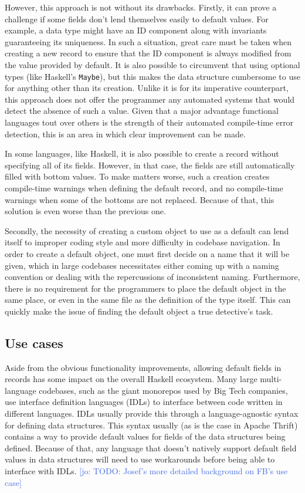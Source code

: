 \documentclass[en]{pracamgr}
\newcommand{\jcom}[1]{\textcolor{RoyalBlue}{[jo: #1]}}
\begin{document}
However, this approach is not without its drawbacks.
Firstly, it can prove a challenge if some fields don't lend themselves easily to default values. 
For example, a data type might have an ID component along with invariants guaranteeing its uniqueness. 
In such a situation, great care must be taken when creating a new record to ensure that the ID component is always modified from the value provided by default.
It is also possible to circumvent that using optional types (like Haskell's \texttt{Maybe}), but this makes the data structure cumbersome to use for anything other than its creation.
Unlike it is for its imperative counterpart, this approach does not offer the programmer any automated systems that would detect the absence of such a value.
Given that a major advantage functional languages tout over others is the strength of their automated compile-time error detection, this is an area in which clear improvement can be made.

In some languages, like Haskell, it is also possible to create a record without specifying all of its fields.
However, in that case, the fields are still automatically filled with bottom values.
To make matters worse, such a creation creates compile-time warnings when defining the default record, and no compile-time warnings when some of the bottoms are not replaced.
Because of that, this solution is even worse than the previous one.

Secondly, the necessity of creating a custom object to use as a default can lend itself to improper coding style and more difficulty in codebase navigation.
In order to create a default object, one must first decide on a name that it will be given, which in large codebases necessitates either coming up with a naming convention or dealing with the repercussions of inconsistent naming. 
Furthermore, there is no requirement for the programmers to place the default object in the same place, or even in the same file as the definition of the type itself.
This can quickly make the issue of finding the default object a true detective's task. 

\subsection{Use cases}
Aside from the obvious functionality improvements, allowing default fields in records has some impact on the overall Haskell ecosystem.
Many large multi-language codebases, such as the giant monorepos used by Big Tech companies, use interface definition languages (IDLs) to interface between code written in different languages.
IDLs usually provide this through a language-agnostic syntax for defining data structures. 
This syntax usually (as is the case in Apache Thrift) contains a way to provide default values for fields of the data structures being defined.
Because of that, any language that doesn't natively support default field values in data structures will need to use workarounds before being able to interface with IDLs.
\jcom{TODO: Josef's more detailed background on FB's use case}
\end{document}
